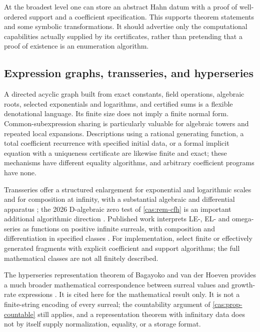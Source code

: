 \documentclass[11pt,letterpaper]{article}
\numberwithin{equation}{section}
\theoremstyle{definition}
\theoremstyle{remark}
\begin{document}
At the broadest level one can store an abstract Hahn datum with a proof of
well-ordered support and a coefficient specification. This supports theorem
statements and some symbolic transformations. It should advertise only the
computational capabilities actually supplied by its certificates, rather than
pretending that a proof of existence is an enumeration algorithm.

\subsection{Expression graphs, transseries, and hyperseries}
\label{cas:sub-graphs}
A directed acyclic graph built from exact constants, field operations, algebraic
roots, selected exponentials and logarithms, and certified sums is a flexible
denotational language. Its finite size does not imply a finite normal form.
Common-subexpression sharing is particularly valuable for algebraic towers and
repeated local expansions. Descriptions using a rational generating function, a
total coefficient recurrence with specified initial data, or a formal implicit
equation with a uniqueness certificate are likewise finite and exact; these
mechanisms have different equality algorithms, and arbitrary coefficient
programs have none.

Transseries offer a structured enlargement for exponential and logarithmic
scales and for composition at infinity, with a substantial algebraic and
differential apparatus \cite{cas:vdH}; the 2026 D-algebraic zero test of
\cref{cas:rem-cfh} is an important additional algorithmic direction
\cite{cas:CFH}. Published work interprets LE-, EL- and omega-series as functions
on positive infinite surreals, with composition and differentiation in specified
classes \cite{cas:BMFunctions}. For implementation, select finite or effectively
generated fragments with explicit coefficient and support algorithms; the full
mathematical classes are not all finitely described.

The hyperseries representation theorem of Bagayoko and van der Hoeven provides a
much broader mathematical correspondence between surreal values and growth-rate
expressions \cite{cas:Hyperseries}. It is cited here for the mathematical result
only. It is not a finite-string encoding of every surreal; the countability
argument of \cref{cas:prop-countable} still applies, and a representation
theorem with infinitary data does not by itself supply normalization, equality,
or a storage format.
\end{document}
